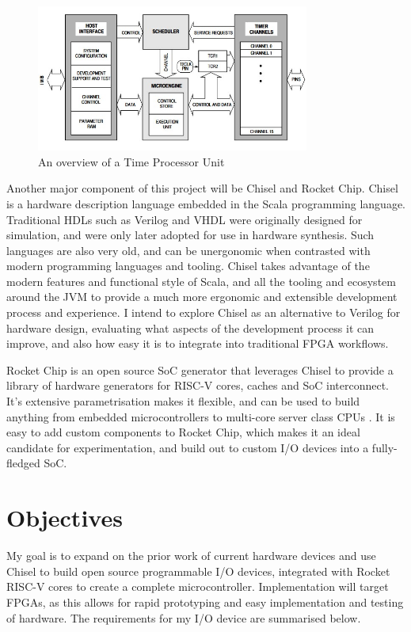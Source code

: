 \documentclass[a4paper,fleqn,12pt]{article}
\begin{document}
\begin{figure}[]
    \centering
    \includegraphics[width=0.8\textwidth]{../img/tpu.jpg}
    \caption{An overview of a Time Processor Unit \cite{tpu}}
    \label{fig:tpu}
\end{figure}

Another major component of this project will be Chisel and Rocket Chip. Chisel is a hardware description language embedded in the Scala programming language. Traditional HDLs such as Verilog and VHDL were originally designed for simulation, and were only later adopted for use in hardware synthesis. Such languages are also very old, and can be unergonomic when contrasted with modern programming languages and tooling. Chisel takes advantage of the modern features and functional style of Scala, and all the tooling and ecosystem around the JVM to provide a much more ergonomic and extensible development process and experience\cite{chisel}. I intend to explore Chisel as an alternative to Verilog for hardware design, evaluating what aspects of the development process it can improve, and also how easy it is to integrate into traditional FPGA workflows.

Rocket Chip is an open source SoC generator that leverages Chisel to provide a library of hardware generators for RISC-V cores, caches and SoC interconnect. It's extensive parametrisation makes it flexible, and can be used to build anything from embedded microcontrollers to multi-core server class CPUs \cite{rocketchip}. It is easy to add custom components to Rocket Chip, which makes it an ideal candidate for experimentation, and build out to custom I/O devices into a fully-fledged SoC.

\section{Objectives}
My goal is to expand on the prior work of current hardware devices and use Chisel to build open source programmable I/O devices, integrated with Rocket RISC-V cores to create a complete microcontroller. Implementation will target FPGAs, as this allows for rapid prototyping and easy implementation and testing of hardware. The requirements for my I/O device are summarised below.
\end{document}
